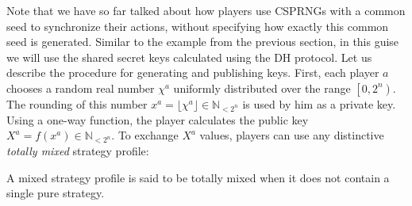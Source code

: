 Note that we have so far talked about how players use CSPRNGs with a common seed to synchronize their actions, without specifying how exactly this common seed is generated. Similar to the example from the previous section, in this guise we will use the shared secret keys calculated using the DH protocol. Let us describe the procedure for generating and publishing keys. First, each player $a$ chooses a random real number $\chi^a$ uniformly distributed over the range $\left[0, 2^n\right)$. The rounding of this number $x^a = \lfloor\chi^a\rfloor \in \mathbb{N}_{<2^n}$ is used by him as a private key. Using a one-way function, the player calculates the public key $X^a = f(x^a) \in \mathbb{N}_{<2^n}$. To exchange $X^a$ values, players can use any distinctive \emph{totally mixed} strategy profile: %

\begin{definition}
	A mixed strategy profile is said to be totally mixed when it does not contain a single pure strategy. %
\end{definition}

